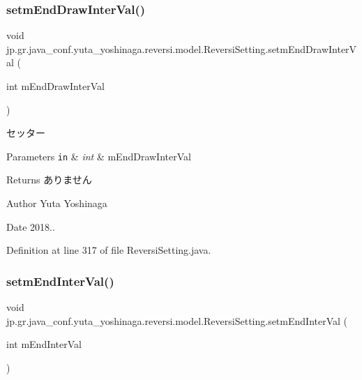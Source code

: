 \subsubsection{\texorpdfstring{setm\+End\+Draw\+Inter\+Val()}{setmEndDrawInterVal()}}
{\footnotesize\ttfamily void jp.\+gr.\+java\+\_\+conf.\+yuta\+\_\+yoshinaga.\+reversi.\+model.\+Reversi\+Setting.\+setm\+End\+Draw\+Inter\+Val (\begin{DoxyParamCaption}\item[{int}]{m\+End\+Draw\+Inter\+Val }\end{DoxyParamCaption})}



セッター 


\begin{DoxyParams}[1]{Parameters}
\mbox{\tt in}  & {\em int} & m\+End\+Draw\+Inter\+Val \\
\hline
\end{DoxyParams}
\begin{DoxyReturn}{Returns}
ありません 
\end{DoxyReturn}
\begin{DoxyAuthor}{Author}
Yuta Yoshinaga 
\end{DoxyAuthor}
\begin{DoxyDate}{Date}
2018.. 
\end{DoxyDate}


Definition at line 317 of file Reversi\+Setting.\+java.

\mbox{\label{classjp_1_1gr_1_1java__conf_1_1yuta__yoshinaga_1_1reversi_1_1model_1_1_reversi_setting_a1782a1a23456afe4cc15e60f697d2747}} 
\subsubsection{\texorpdfstring{setm\+End\+Inter\+Val()}{setmEndInterVal()}}
{\footnotesize\ttfamily void jp.\+gr.\+java\+\_\+conf.\+yuta\+\_\+yoshinaga.\+reversi.\+model.\+Reversi\+Setting.\+setm\+End\+Inter\+Val (\begin{DoxyParamCaption}\item[{int}]{m\+End\+Inter\+Val }\end{DoxyParamCaption})}



